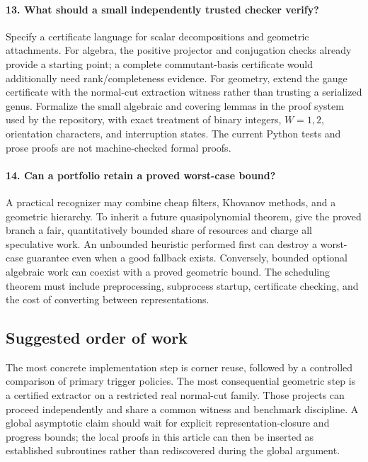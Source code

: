 \documentclass[11pt,a4paper]{article}
\theoremstyle{definition}\newtheorem{definition}[theorem]{Definition}
\theoremstyle{remark}\newtheorem{remark}[theorem]{Remark}
\begin{document}
\paragraph{13. What should a small independently trusted checker verify?}
Specify a certificate language for scalar decompositions and geometric
attachments. For algebra, the positive projector and conjugation checks
already provide a starting point; a complete commutant-basis certificate
would additionally need rank/completeness evidence. For geometry, extend
the gauge certificate with the normal-cut extraction witness rather than
trusting a serialized genus. Formalize the small algebraic and covering
lemmas in the proof system used by the repository, with exact treatment of
binary integers, $W=1,2$, orientation characters, and interruption states.
The current Python tests and prose proofs are not machine-checked formal
proofs.

\paragraph{14. Can a portfolio retain a proved worst-case bound?}
A practical recognizer may combine cheap filters, Khovanov methods, and a
geometric hierarchy. To inherit a future quasipolynomial theorem, give the
proved branch a fair, quantitatively bounded share of resources and charge
all speculative work. An unbounded heuristic performed first can destroy
a worst-case guarantee even when a good fallback exists. Conversely,
bounded optional algebraic work can coexist with a proved geometric bound.
The scheduling theorem must include preprocessing, subprocess startup,
certificate checking, and the cost of converting between representations.

\subsection{Suggested order of work}

The most concrete implementation step is corner reuse, followed by a
controlled comparison of primary trigger policies. The most consequential
geometric step is a certified extractor on a restricted real normal-cut
family. Those projects can proceed independently and share a common
witness and benchmark discipline. A global asymptotic claim should wait
for explicit representation-closure and progress bounds; the local proofs
in this article can then be inserted as established subroutines rather
than rediscovered during the global argument.
\end{document}

